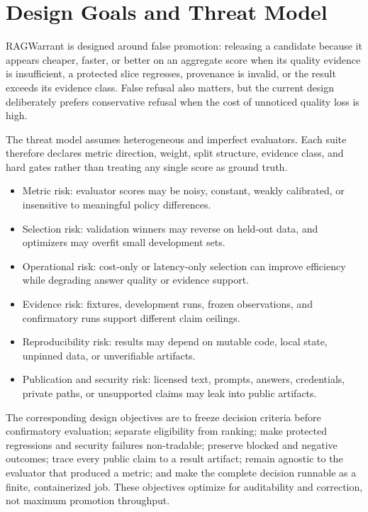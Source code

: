 \documentclass[11pt]{article}
\begin{document}
\section{Design Goals and Threat Model}\label{sec:threat-model}

RAGWarrant is designed around false promotion: releasing a candidate
because it appears cheaper, faster, or better on an aggregate score when
its quality evidence is insufficient, a protected slice regresses,
provenance is invalid, or the result exceeds its evidence class. False
refusal also matters, but the current design deliberately prefers
conservative refusal when the cost of unnoticed quality loss is high.

The threat model assumes heterogeneous and imperfect evaluators. Each
suite therefore declares metric direction, weight, split structure,
evidence class, and hard gates rather than treating any single score as
ground truth.

\begin{itemize}
\item
  Metric risk: evaluator scores may be noisy, constant, weakly
  calibrated, or insensitive to meaningful policy differences.
\item
  Selection risk: validation winners may reverse on held-out data, and
  optimizers may overfit small development sets.
\item
  Operational risk: cost-only or latency-only selection can improve
  efficiency while degrading answer quality or evidence support.
\item
  Evidence risk: fixtures, development runs, frozen observations, and
  confirmatory runs support different claim ceilings.
\item
  Reproducibility risk: results may depend on mutable code, local state,
  unpinned data, or unverifiable artifacts.
\item
  Publication and security risk: licensed text, prompts, answers,
  credentials, private paths, or unsupported claims may leak into public
  artifacts.
\end{itemize}

The corresponding design objectives are to freeze decision criteria
before confirmatory evaluation; separate eligibility from ranking; make
protected regressions and security failures non-tradable; preserve
blocked and negative outcomes; trace every public claim to a result
artifact; remain agnostic to the evaluator that produced a metric; and
make the complete decision runnable as a finite, containerized job.
These objectives optimize for auditability and correction, not maximum
promotion throughput.
\end{document}
